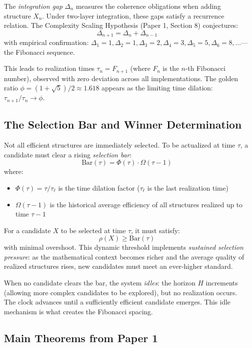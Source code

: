 \documentclass[11pt]{article}
\theoremstyle{definition}
\begin{document}
The \emph{integration gap} $\Delta_n$ measures the coherence obligations when adding structure $X_n$. Under two-layer integration, these gaps satisfy a recurrence relation. The Complexity Scaling Hypothesis (Paper 1, Section 8) conjectures:
\[
\Delta_{n+1} = \Delta_n + \Delta_{n-1}
\]
with empirical confirmation: $\Delta_1 = 1, \Delta_2 = 1, \Delta_3 = 2, \Delta_4 = 3, \Delta_5 = 5, \Delta_6 = 8, \ldots$—the Fibonacci sequence.

This leads to realization times $\tau_n = F_{n+1}$ (where $F_n$ is the $n$-th Fibonacci number), observed with zero deviation across all implementations. The golden ratio $\phi = (1+\sqrt{5})/2 \approx 1.618$ appears as the limiting time dilation: $\tau_{n+1}/\tau_n \to \phi$.

\subsection{The Selection Bar and Winner Determination}

Not all efficient structures are immediately selected. To be actualized at time $\tau$, a candidate must clear a rising \emph{selection bar}:
\[
\text{Bar}(\tau) = \Phi(\tau) \cdot \Omega(\tau-1)
\]
where:
\begin{itemize}
\item $\Phi(\tau) = \tau/\tau_\ell$ is the time dilation factor ($\tau_\ell$ is the last realization time)
\item $\Omega(\tau-1)$ is the historical average efficiency of all structures realized up to time $\tau-1$
\end{itemize}

For a candidate $X$ to be selected at time $\tau$, it must satisfy:
\[
\rho(X) \geq \text{Bar}(\tau)
\]
with minimal overshoot. This dynamic threshold implements \emph{sustained selection pressure}: as the mathematical context becomes richer and the average quality of realized structures rises, new candidates must meet an ever-higher standard.

When no candidate clears the bar, the system \emph{idles}: the horizon $H$ increments (allowing more complex candidates to be explored), but no realization occurs. The clock advances until a sufficiently efficient candidate emerges. This idle mechanism is what creates the Fibonacci spacing.

\subsection{Main Theorems from Paper 1}
\end{document}
